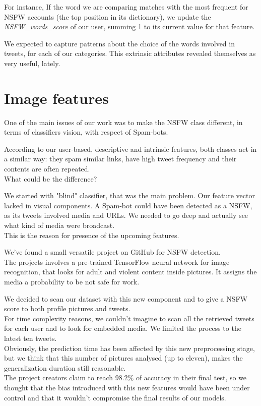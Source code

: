 For instance, If the word we are comparing matches with the most frequent for NSFW accounts (the top position in its dictionary), we update the \textit{NSFW\_words\_score} of our user, summing 1 to its current value for that feature.

We expected to capture patterns about the choice of the words involved in tweets, for each of our categories.
This extrinsic attributes revealed themselves as very useful, lately.


\section{Image features}
One of the main issues of our work was to make the NSFW class different, in terms of classifiers vision, with respect of Spam-bots.

According to our user-based, descriptive and intrinsic features, both classes act in a similar way: they spam similar links, have high tweet frequency and their contents are often repeated.\\
What could be the difference?

We started with "blind" classifier, that was the main problem. Our feature vector lacked in visual components. A Spam-bot could have been detected as a NSFW, as its tweets involved media and URLs. We needed to go deep and actually see what kind of media were broadcast.\\
This is the reason for presence of the upcoming features.

We've found a small versatile project on GitHub for NSFW detection.\\
The projects involves a pre-trained TensorFlow neural network for image recognition, that looks for adult and violent content inside pictures. It assigns the media a probability to be not safe for work.

We decided to scan our dataset with this new component and to give a NSFW score to both profile pictures and tweets.\\
For time complexity reasons, we couldn't imagine to scan all the retrieved tweets for each user and to look for embedded media. We limited the process to the latest ten tweets.\\

Obviously, the prediction time has been affected by this new preprocessing stage, but we think that this number of pictures analysed (up to eleven), makes the generalization duration still reasonable.\\
The project creators claim to reach 98.2\% of accuracy in their final test, so we thought that the bias introduced with this new features would have been under control and that it wouldn't compromise the final results of our models.


